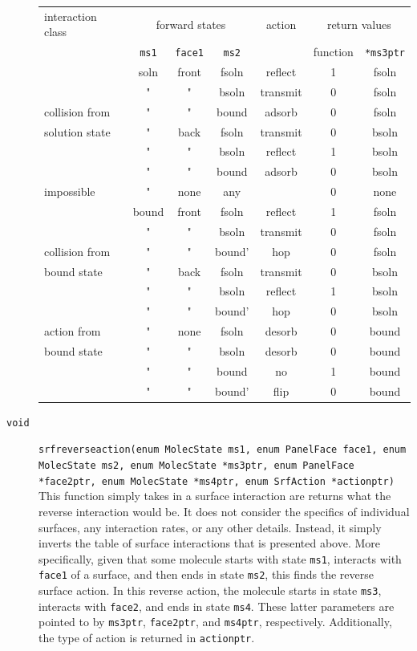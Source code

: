\documentclass {scrbook}
\newcommand {\ttt} {\texttt}
\begin{document}
\begin{description}
\begin{longtable}[c]{l|ccc|c|cc}
interaction class&\multicolumn{3}{c}{forward states}&action&\multicolumn{2}{c}{return values}\\
&\ttt{ms1}&\ttt{face1}&\ttt{ms2}& &function&\ttt{*ms3ptr}\\
\hline
&soln&front&fsoln&reflect&1&fsoln\\
&"&"&bsoln&transmit&0&fsoln\\
collision from&"&"&bound&adsorb&0&fsoln\\
solution state&"&back&fsoln&transmit&0&bsoln\\
&"&"&bsoln&reflect&1&bsoln\\
&"&"&bound&adsorb&0&bsoln\\
\hline
impossible&"&none&any& &0&none\\
\hline
&bound&front&fsoln&reflect&1&fsoln\\
&"&"&bsoln&transmit&0&fsoln\\
collision from&"&"&bound'&hop&0&fsoln\\
bound state&"&back&fsoln&transmit&0&bsoln\\
&"&"&bsoln&reflect&1&bsoln\\
&"&"&bound'&hop&0&bsoln\\
\hline
action from&"&none&fsoln&desorb&0&bound\\
bound state&"&"&bsoln&desorb&0&bound\\
&"&"&bound&no&1&bound\\
&"&"&bound'&flip&0&bound\\
\end{longtable}

\item[\ttt{void}]
\ttt{srfreverseaction(enum MolecState ms1, enum PanelFace face1, enum MolecState ms2, enum MolecState *ms3ptr, enum PanelFace *face2ptr, enum MolecState *ms4ptr, enum SrfAction *actionptr)}
\hfill \\
This function simply takes in a surface interaction are returns what the reverse interaction would be. It does not consider the specifics of individual surfaces, any interaction rates, or any other details. Instead, it simply inverts the table of surface interactions that is presented above. More specifically, given that some molecule starts with state \ttt{ms1}, interacts with \ttt{face1} of a surface, and then ends in state \ttt{ms2}, this finds the reverse surface action. In this reverse action, the molecule starts in state \ttt{ms3}, interacts with \ttt{face2}, and ends in state \ttt{ms4}. These latter parameters are pointed to by \ttt{ms3ptr}, \ttt{face2ptr}, and \ttt{ms4ptr}, respectively. Additionally, the type of action is returned in \ttt{actionptr}.


\end{description}
\end{document}
